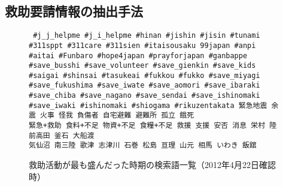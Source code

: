 \documentclass[japanese]{jnlp_1.4}
\begin{document}
\subsection{救助要請情報の抽出手法}
\label{algorithm}

\begin{figure}[t]
  \begin{center}
    \sloppy
    \begin{screen}
      \tt
      \#j\_j\_helpme \#j\_i\_helpme \#hinan \#jishin \#jisin \#tunami 
      \#311sppt \#311care \#311sien \#itaisousaku 99japan
      \#anpi \#aitai \#Funbaro \#hope4japan \#prayforjapan
      \#ganbappe \#save\_busshi \#save\_volunteer \#save\_gienkin \#save\_kids 
      \#saigai \#shinsai \#tasukeai \#fukkou \#fukko
      \#save\_miyagi \#save\_fukushima \#save\_iwate \#save\_aomori 
      \#save\_ibaraki \#save\_chiba \#save\_nagano \#save\_sendai
      \#save\_ishinomaki \#save\_iwaki \#ishinomaki \#shiogama 
      \#rikuzentakata 
      緊急地震 余震 火事 怪我 負傷者 
      自宅避難 避難所 孤立 餓死 \\緊急+救助 食料+不足 
      物資+不足 食糧+不足 救援 支援 安否 消息 栄村 陸前高田 
      釜石 大船渡 \\ 気仙沼 南三陸 歌津 志津川 石巻 松島 亘理 山元 相馬 いわき 飯舘
    \end{screen}
  \end{center}
  \caption{救助活動が最も盛んだった時期の検索語一覧（2012年4月22日確認時）}
  \label{keyword}
\end{figure}
\end{document}
